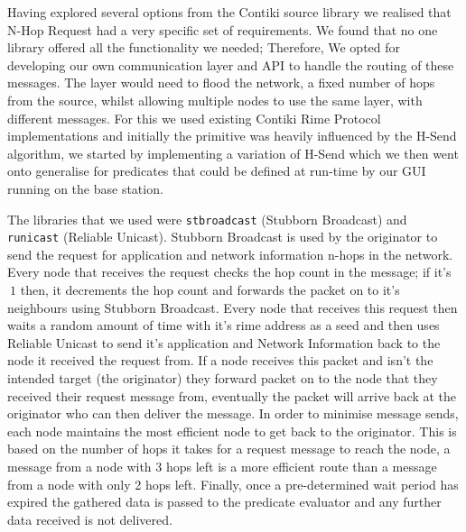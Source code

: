 Having explored several options from the Contiki source library we realised that N-Hop Request had a very specific set of requirements. We found that no one library offered all the functionality we needed; Therefore, We opted for developing our own communication layer and API to handle the routing of these messages. The layer would need to flood the network, a fixed number of hops from the source, whilst allowing multiple nodes to use the same layer, with different messages. For this we used existing Contiki Rime Protocol implementations and initially the primitive was heavily influenced by the H-Send\cite{HSEND} algorithm, we started by implementing a variation of H-Send which we then went onto generalise for predicates that could be defined at run-time by our GUI running on the base station.

The libraries that we used were \verb|stbroadcast| (Stubborn Broadcast) and \verb|runicast| (Reliable Unicast). Stubborn Broadcast is used by the originator to send the request for application and network information n-hops in the network. Every node that receives the request checks the hop count in the message; if it's $\> 1$ then, it decrements the hop count and forwards the packet on to it's neighbours using Stubborn Broadcast. Every node that receives this request then waits a random amount of time with it's rime address as a seed and then uses Reliable Unicast to send it's application and Network Information back to the node it received the request from. If a node receives this packet and isn't the intended target (the originator) they forward packet on to the node that they received their request message from, eventually the packet will arrive back at the originator who can then deliver the message. In order to minimise message sends, each node maintains the most efficient node to get back to the originator. This is based on the number of hops it takes for a request message to reach the node, a message from a node with 3 hops left is a more efficient route than a message from a node with only 2 hops left. Finally, once a pre-determined wait period has expired the gathered data is passed to the predicate evaluator and any further data received is not delivered.


